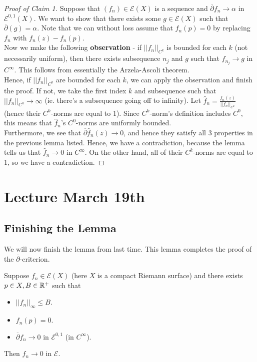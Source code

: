 \documentclass{article}
\begin{document}
{\begin{proof}[Proof of Claim 1]
    Suppose that $(f_n) \in \mathcal{E}(X)$ is a sequence and $\overline{\partial} f_n \to \alpha$ in $\mathcal{E}^{0, 1}(X)$. We want to show that there exists some $g \in \mathcal{E}(X)$ such that $\overline{\partial}(g) = \alpha$. Note that we can without loss assume that $f_n(p) = 0$ by replacing $f_n$ with $f_n(z) - f_n(p)$.\\
    
    Now we make the following \textbf{observation} - if $||f_n||_{C^k}$ is bounded for each $k$ (not necessarily uniform), then there exists subsequence $n_j$ and $g$ such that $f_{n_j} \to g$ in $C^\infty$. This follows from essentially the Arzela-Ascoli theorem.\\

    Hence, if $||f_n||_{C^k}$ are bounded for each $k$, we can apply the observation and finish the proof. If not, we take the first index $k$ and subsequence such that $||f_n||_{C^k} \to \infty$ (ie. there's a subsequence going off to infinity). Let $\hat{f}_n = \frac{f_n(z)}{||f_n||_{C^k}}$ (hence their $C^k$-norms are equal to 1). Since $C^k$-norm's definition includes $C^0$, this means that $\hat{f}_n$'s $C^0$-norms are uniformly bounded.\\

    Furthermore, we see that $\overline{\partial} \hat{f}_n(z) \to 0$, and hence they satisfy all 3 properties in the previous lemma listed. Hence, we have a contradiction, because the lemma tells us that $\hat{f}_n \to 0$ in $C^\infty$. On the other hand, all of their $C^k$-norms are equal to 1, so we have a contradiction.
\end{proof}

\newpage
\section{Lecture March 19th}

\subsection{Finishing the Lemma}
We will now finish the lemma from last time. This lemma completes the proof of the $\overline{\partial}$-criterion.
\begin{lemma}\label{lem:partial-lemma}
    Suppose $f_n \in \mathcal{E}(X)$ (here $X$ is a compact Riemann surface) and there exists $p \in X, B \in \mathbb{R}^+$ such that
    \begin{itemize}
        \item $||f_n||_{\infty} \leq B$.
        \item $f_n(p) = 0$.
        \item $\overline{\partial} f_n \to 0$ in $\mathcal{E}^{0, 1}$ (in $C^\infty$).
    \end{itemize}
    Then $f_n \to 0$ in $\mathcal{E}$.
\end{lemma}

}
\end{document}
